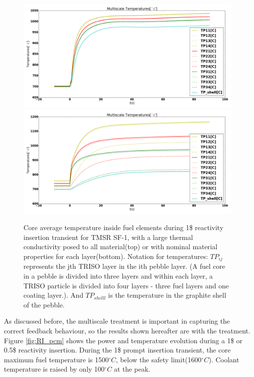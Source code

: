 \documentclass{elsarticle}
\begin{document}
\begin{figure}
    \centering
    \includegraphics[width=\textwidth]{images/diffusion/tmsr/RI/compare_multiscale/temps_large_k.png}
    \includegraphics[width=\textwidth]{images/diffusion/tmsr/RI/compare_multiscale/temps_nominal_k.png}
    \caption{Core average temperature inside fuel elements during 1\$ reactivity insertion transient for TMSR SF-1, with a large thermal conductivity posed to all material(top) or with nominal material properties for each layer(bottom). Notation for temperatures: $TP_{ij}$ represents the jth TRISO layer in the ith pebble layer. (A fuel core in a pebble is divided into three layers and within each layer, a TRISO particle is divided into four layers - three fuel layers and one coating layer.). And $TP_{shelll}$ is the temperature in the graphite shell of the pebble.} 
    \label{fig:temps_TMSR}
\end{figure}

 
\newpage
As discussed before, the multiscale treatment is important in capturing the correct feedback behaviour, so the results shown hereafter are with the treatment.  
Figure \ref{fig:RI_pcm} shows the power and temperature evolution during a 1\$ or 0.5\$ reactivity insertion. 
 During the 1\$ prompt insertion transient, the core maximum fuel temperature is 1500$^{\circ}C$, below the safety limit(1600$^{\circ}C$). 
Coolant temperature is raised by only 100$^{\circ}C$ at the peak. 
\end{document}
